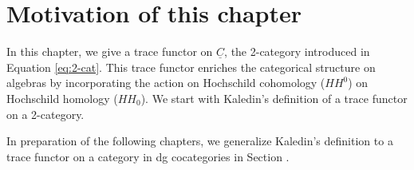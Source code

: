 \section{Motivation of this chapter}
In this chapter, we give a trace functor 
on $\underline{C}$, the 2-category 
introduced in Equation 
\ref{eq:2-cat}. This trace functor enriches 
the categorical structure on algebras by 
incorporating the action on Hochschild 
cohomology ($HH^0$) on Hochschild homology 
($HH_0$). We start with Kaledin's definition 
of a trace functor on a 2-category.

In preparation of the following chapters, we 
generalize Kaledin's definition to a 
trace functor on a category in dg cocategories 
in Section \label{sec:redefine_trace}.